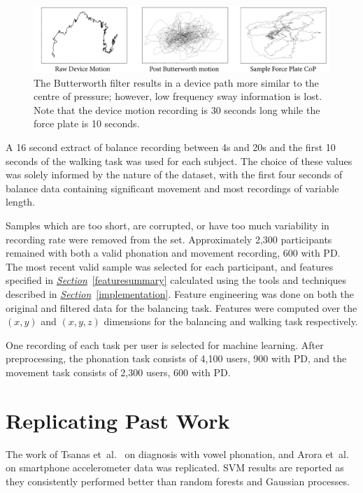 \documentclass[12pt, twoside]{book}
\begin{document}
\begin{figure}[!htb]
	\centering\centerline{\includegraphics[width=1.15\linewidth]{butterworth.png}}
	\caption{The Butterworth filter results in a device path more similar to the centre of pressure; however, low frequency sway information is lost. Note that the device motion recording is 30 seconds long while the force plate is 10 seconds.}
	\label{butterworth}
	\vspace*{-0.5em}
\end{figure}


A 16 second extract of balance recording between 4s and 20s and the first 10 seconds of the walking task was used for each subject. The choice of these values was solely informed by the nature of the dataset, with the first four seconds of balance data containing significant movement and most recordings of variable length.

Samples which are too short, are corrupted, or have too much variability in recording rate were removed from the set. Approximately 2,300 participants remained with both a valid phonation and movement recording, 600 with PD. The most recent valid sample was selected for each participant, and features specified in \textit{\hyperref[featuresummary]{Section}}~\ref{featuresummary} calculated using the tools and techniques described in \textit{\hyperref[implementation]{Section}}~\ref{implementation}.  Feature engineering was done on both the original and filtered data for the balancing task. Features were computed over the $(x,y)$ and $(x,y,z)$ dimensions for the balancing and walking task respectively.

\begin{highlight}
	One recording of each task per user is selected for machine learning. After preprocessing, the phonation task consists of 4,100 users, 900 with PD, and the movement task consists of 2,300 users, 600 with PD.
\end{highlight}

\newpage
\section{Replicating Past Work}
\label{pastwork}
The work of Tsanas et~al.~\cite{tsanas2012novel} on diagnosis with vowel phonation, and Arora et~al.~\cite{arora2014high} on smartphone accelerometer data was replicated. SVM results are reported as they consistently performed better than random forests and Gaussian processes.
\end{document}
